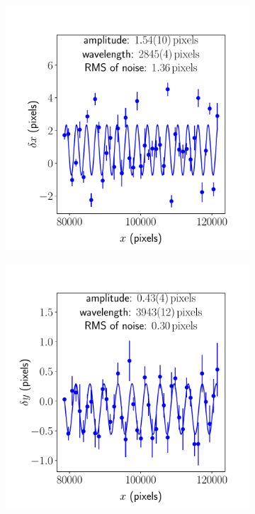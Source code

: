 \documentclass{article}
\begin{document}
\begin{figure}[ht]
\begin{subfigure}{0.24\linewidth}
		\caption{}
		\label{fig:sinewave2yy1}
	\end{subfigure}
	\begin{subfigure}{0.24\linewidth}
		\includegraphics[width=\linewidth]{sine-wave-4-xx-1.pdf}
		\caption{}
		\label{fig:sinewave4xx1}
	\end{subfigure}
	\begin{subfigure}{0.24\linewidth}
		\includegraphics[width=\linewidth]{sine-wave-4-yx-1.pdf}

\end{subfigure}
\end{figure}
\end{document}
